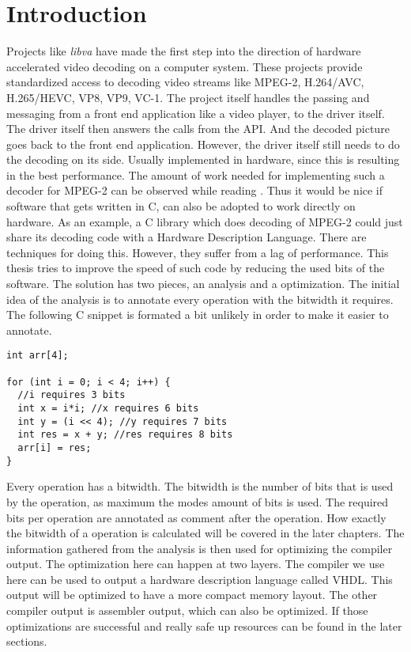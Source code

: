 \chapter{Introduction}\label{sec:intro}

Projects like \textit{libva} have made the first step into the direction of hardware accelerated video decoding on a computer system. These projects provide standardized access to decoding video streams like MPEG-2, H.264/AVC, H.265/HEVC, VP8, VP9, VC-1. The project itself handles the passing and messaging from a front end application like a video player, to the driver itself. The driver itself then answers the calls from the API. And the decoded picture goes back to the front end application. However, the driver itself still needs to do the decoding on its side. Usually implemented in hardware, since this is resulting in the best performance. The amount of work needed for implementing such a decoder for MPEG-2 can be observed while reading \cite{mpeg2-modelling}.
Thus it would be nice if software that gets written in C, can also be adopted to work directly on hardware. As an example, a C library which does decoding of MPEG-2 could just share its decoding code with a Hardware Description Language. There are techniques for doing this. However, they suffer from a lag of performance.
This thesis tries to improve the speed of such code by reducing the used bits of the software. The solution has two pieces, an analysis and a optimization.
The initial idea of the analysis is to annotate every operation with the bitwidth it requires. The following C snippet is formated a bit unlikely in order to make it easier to annotate.
\begin{lstlisting}[frame=single]
int arr[4];

for (int i = 0; i < 4; i++) {
  //i requires 3 bits
  int x = i*i; //x requires 6 bits
  int y = (i << 4); //y requires 7 bits
  int res = x + y; //res requires 8 bits
  arr[i] = res;
}
\end{lstlisting}
Every operation has a bitwidth. The bitwidth is the number of bits that is used by the operation, as maximum the modes amount of bits is used. The required bits per operation are annotated as comment after the operation.
How exactly the bitwidth of a operation is calculated will be covered in the later chapters.
The information gathered from the analysis is then used for optimizing the compiler output. The optimization here can happen at two layers. The compiler we use here can be used to output a hardware description language called VHDL. This output will be optimized to have a more compact memory layout.
The other compiler output is assembler output, which can also be optimized. If those optimizations are successful and really safe up resources can be found in the later sections.

